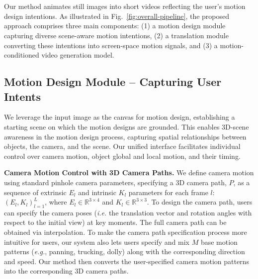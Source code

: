 
\section{\MOCA}
\label{sec-3-method}



Our method animates still images into short videos reflecting the user's motion design intentions. As illustrated in Fig.~\ref{fig:overall-pipeline}, the proposed approach comprises three main components: (1) a motion design module capturing diverse scene-aware motion intentions, (2) a translation module converting these intentions into screen-space motion signals, and (3) a motion-conditioned video generation model. 


\subsection{Motion Design Module -- Capturing User Intents}
\label{sec-3.1-motion-design}
We leverage the input image as the canvas for motion design, establishing a starting scene on which the motion designs are grounded. This enables 3D-scene awareness in the motion design process, capturing spatial relationships between objects, the camera, and the scene. Our unified interface facilitates individual control over camera motion, object global and local motion, and their timing.

\textbf{Camera Motion Control with 3D Camera Paths.}
We define camera motion using standard pinhole camera parameters, specifying a 3D camera path, $P$, as a sequence of extrinsic $E_l$ and intrinsic $K_l$ parameters for each frame $l$: $(E_l, K_l)_{l=1}^{L}$, where $E_l\in \mathbb{R}^{3\times4}$ and $K_l \in \mathbb{R}^{3\times 3}$.
To design the camera path, users can specify the camera poses (\textit{i.e.} the translation vector and rotation angles with respect to the initial view) at key moments. The full camera path can be obtained via interpolation.
To make the camera path specification process more intuitive for users, our system also lets users specify and mix $M$ base motion patterns (\textit{e.g.}, panning, trucking, dolly) along with the corresponding direction and speed. Our method then converts the user-specified camera motion patterns into the corresponding 3D camera paths. 

